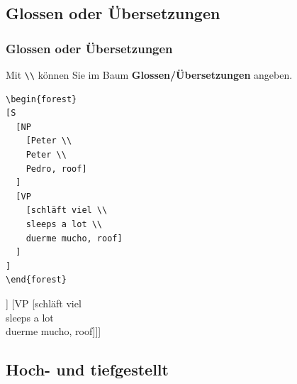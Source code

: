 \subsection{Glossen oder Übersetzungen}

\begin{frame}[fragile]
\frametitle{Glossen oder Übersetzungen}


Mit \lstinline|\\| können Sie im Baum \textbf{Glossen/Übersetzungen} angeben.


\begin{minipage}[t]{.48\textwidth}
	\small	
\begin{lstlisting}
\begin{forest}
[S 
  [NP 
    [Peter \\ 
    Peter \\ 
    Pedro, roof]
  ] 
  [VP 
    [schläft viel \\ 
    sleeps a lot \\ 
    duerme mucho, roof]
  ]
]
\end{forest}
\end{lstlisting}
\end{minipage}
\begin{minipage}[t]{.48\textwidth}
	
\begin{exe}
	\ex 
	\begin{forest}
		[S [NP [Peter \\ Peter \\ Pedro, roof]] 
		[VP [schläft viel \\ 
		sleeps a lot \\ 
		duerme mucho, roof]]]
	\end{forest}
\end{exe}
\end{minipage}

\end{frame}


\subsection{Hoch- und tiefgestellt}

